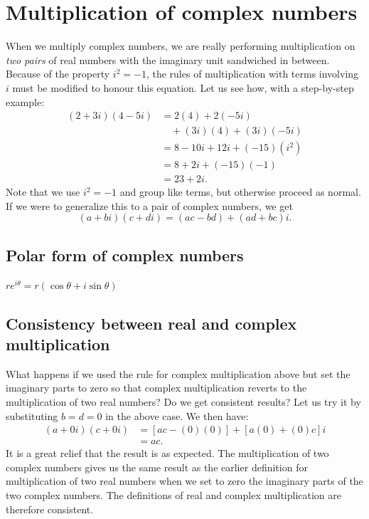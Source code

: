 \documentclass[
  a4paper,
]{article}
\begin{document}
\hypertarget{multiplication-of-complex-numbers}{%
\section{Multiplication of complex
numbers}\label{multiplication-of-complex-numbers}}

When we multiply complex numbers, we are really performing
multiplication on \emph{two pairs} of real numbers with the imaginary
unit sandwiched in between. Because of the property \(i^2 = -1\), the
rules of multiplication with terms involving \(i\) must be modified to
honour this equation. Let us see how, with a step-by-step example: \[
\begin{aligned}
(2 + 3i)(4 - 5i) & = 2(4) + 2(-5i)\\
& \quad + (3i)(4) + (3i)(-5i)\\
& = 8 - 10i + 12i + (-15)(i^2)\\
& = 8 + 2i + (-15)(-1)\\
& = 23 + 2i.
\end{aligned}
\] Note that we use \(i^2 = -1\) and group like terms, but otherwise
proceed as normal. If we were to generalize this to a pair of complex
numbers, we get \[(a + bi)(c + di) = (ac - bd) + (ad + bc)i.\]

\hypertarget{polar-form-of-complex-numbers}{%
\subsection{Polar form of complex
numbers}\label{polar-form-of-complex-numbers}}

\(re^{i\theta} = r(\cos\theta + i\sin\theta)\)

\hypertarget{consistency-between-real-and-complex-multiplication}{%
\subsection{Consistency between real and complex
multiplication}\label{consistency-between-real-and-complex-multiplication}}

What happens if we used the rule for complex multiplication above but
set the imaginary parts to zero so that complex multiplication reverts
to the multiplication of two real numbers? Do we get consistent results?
Let us try it by substituting \(b = d = 0\) in the above case. We then
have: \[
\begin{aligned}
(a + 0i)(c + 0i) & = [ac - (0)(0)] + [a(0) + (0)c]i\\
& = ac.
\end{aligned}
\] It is a great relief that the result is as expected. The
multiplication of two complex numbers gives us the same result as the
earlier definition for multiplication of two real numbers when we set to
zero the imaginary parts of the two complex numbers. The definitions of
real and complex multiplication are therefore consistent.
\end{document}
